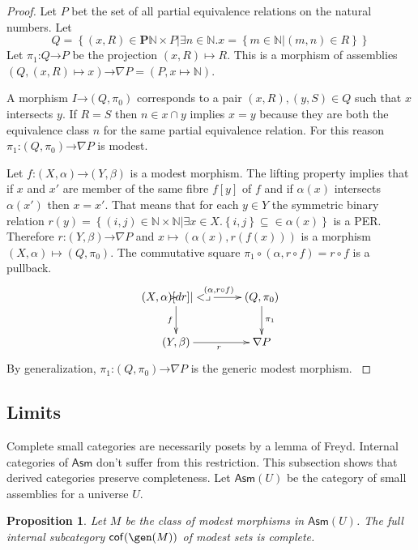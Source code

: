 \documentclass{amsart}
\theoremstyle{plain}
\newtheorem{prop}[theorem]{Proposition}
\theoremstyle{definition}
\newcommand\set[1]{\left\{#1\right\}}
\newcommand\N{\mathbb N}
\newcommand\pow{\mathbf P}
\newcommand\Asm{\mathsf{Asm}}
\newcommand\of{\mathord:}
\renewcommand\to{\mathord\rightarrow}
\begin{document}
\begin{proof} Let $P$ bet the set of all partial equivalence relations on the natural numbers. Let
\[Q=\set{(x,R)\in\pow\N\times P| \exists n\in \N. x = \set{ m\in \N | (m,n)\in R}}\]
Let $\pi_1\of Q\to P$ be the projection $(x,R) \mapsto R$. This is a morphism of assemblies $(Q,(x,R)\mapsto x) \to \nabla P=(P, x\mapsto \N)$.

A morphism $I\to(Q,\pi_0)$ corresponds to a pair $(x,R),(y,S)\in Q$ such that $x$ intersects $y$. If $R=S$ then $n\in x\cap y$ implies $x=y$ because they are both the equivalence class $n$ for the same partial equivalence relation. For this reason $\pi_1\of (Q,\pi_0)\to\nabla P$ is modest.

Let $f\of(X,\alpha)\to(Y,\beta)$ is a modest morphism. The lifting property implies that if $x$ and $x'$ are member of the same fibre $f[y]$ of $f$ and if $\alpha(x)$ intersects $\alpha(x')$ then $x=x'$. That means that for each $y\in Y$ the symmetric binary relation $r(y) = \set{(i,j)\in \N\times\N| \exists x\in X. \set{i,j}\subseteq \in \alpha(x)}$ is a PER. Therefore $r\of(Y,\beta)\to \nabla P$ and $x\mapsto (\alpha(x),r(f(x)))$ is a morphism $(X,\alpha)\mapsto(Q,\pi_0)$. The commutative square $\pi_1\circ (\alpha,r\circ f) = r\circ f$ is a pullback.
\[\xymatrix{
(X,\alpha)\ar[d]_f\ar[r]^{(\alpha,r\circ f)}\pb & (Q,\pi_0)\ar[d]^{\pi_1}\\
(Y,\beta) \ar[r]_{r} & \nabla P
}\]
By generalization, $\pi_1\of (Q,\pi_0)\to\nabla P$ is the generic modest morphism. \label{generic modest}
\end{proof}

\subsection{Limits}
Complete small categories are necessarily posets by a lemma of Freyd. Internal categories of $\Asm$ don't suffer from this restriction. This subsection shows that derived categories preserve completeness. Let $\Asm(U)$ be the category of small assemblies for a universe $U$.

\begin{prop} Let $M$ be the class of modest morphisms in $\Asm(U)$. The full internal subcategory $\cof(\gen(M))$ of \emph{modest sets} is complete. \end{prop}
\end{document}
